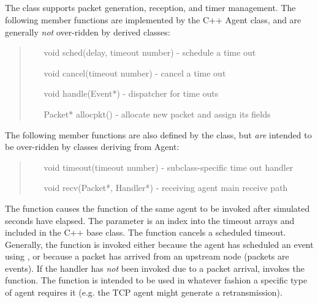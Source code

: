 \subsection{}

The  class supports packet generation, reception,
and timer management.
The following member functions are implemented by the C++ Agent class, and are
generally {\em not} over-ridden by derived classes:
\begin{tt}
\begin{quote}
\begin{itemize}
        \item[void sched(delay, timeout number)] - schedule a time out
        \item[void cancel(timeout number)] - cancel a time out
        \item[void handle(Event*)] - dispatcher for time outs
        \item[Packet* allocpkt()] - allocate new packet and assign its fields
\end{itemize}
\end{quote}
\end{tt}
The following member functions are also defined by the  class,
but {\em are} intended to be over-ridden by classes deriving from Agent:
\begin{tt}
\begin{quote}
\begin{itemize}
        \item[void timeout(timeout number)] - subclass-specific time out handler
        \item[void recv(Packet*, Handler*)] - receiving agent main receive path
\end{itemize}
\end{quote}
\end{tt}
The  function causes the  function
of the same agent to be invoked after  simulated
seconds have elapsed.
The  parameter is an index into the
timeout arrays  and  included in the
C++  base class.
The  function cancels a scheduled timeout.
Generally, the  function is invoked either
because the agent has scheduled an event using , or
because a packet has arrived from an upstream node (packets are events).
If the handler has \emph{not} been invoked due to a packet arrival,
 invokes the  function.
The  function is intended to be used in whatever fashion
a specific type of agent requires it
(e.g. the TCP agent might generate a retransmission).

